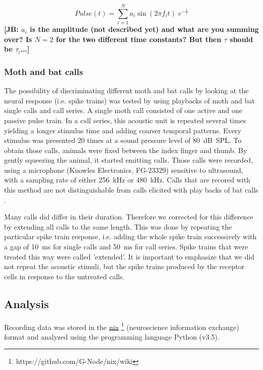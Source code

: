 \documentclass[12pt,a4paper]{article}
\newcommand{\note}[2][]{\textbf{[#1: #2]}}
\newcommand{\notejb}[1]{\note[JB]{#1}}
\begin{document}
\begin{equation}
  \label{eq:DampedSine}
  Pulse(t) = \sum_{i=1}^{N} a_i \sin(2 \pi f_i t) \; e^{-\frac{t}{\tau}}
\end{equation}
\notejb{$a_i$ is the amplitude (not described yet) and what are you summing over? Is $N=2$ for the two different time constants? But then $\tau$ should be $\tau_i$...}

\subsubsection{Moth and bat calls}
The possibility of discriminating different moth and bat calls by looking at the neural response (i.e. spike trains) was tested by using playbacks of moth and bat single calls and call series. A single moth call consisted of one active and one passive pulse train. In a call series, this acoustic unit is repeated several times yielding a longer stimulus time and adding coarser temporal patterns. Every stimulus was presented 20 times at a sound pressure level of 80~dB~SPL. To obtain those calls, animals were fixed between the index finger and thumb. By gently squeezing the animal, it started emitting calls. Those calls were recorded, using a microphone (Knowles Electronics, FG-23329) sensitive to ultrasound, with a sampling rate of either 256~kHz or 480~kHz. Calls that are recored with this method are not distinguishable from calls elicited with play backs of bat calls \cite{barber2006, corcoran2010}.

Many calls did differ in their duration. Therefore we corrected for this difference by extending all calls to the same length. This was done by repeating the particular spike train response, i.e. adding the whole spike train successively with a gap of 10~ms for single calls and 50~ms for call series. Spike trains that were treated this way were called 'extended'. It is important to emphasize that we did not repeat the acoustic stimuli, but the spike trains produced by the receptor cells in response to the untreated calls.


\subsection{Analysis}
Recording data was stored in the \href{https://github.com/G-Node/nix/wiki}{nix} \footnote{https://github.com/G-Node/nix/wiki} (neuroscience information exchange) format and analyzed using the programming language Python (v3.5).
 
\end{document}
